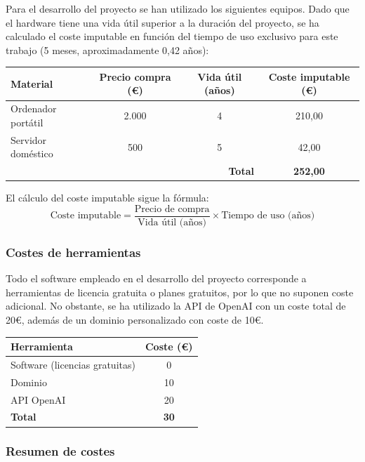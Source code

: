 Para el desarrollo del proyecto se han utilizado los siguientes equipos. Dado que el hardware tiene una vida útil superior a la duración del proyecto, se ha calculado el coste imputable en función del tiempo de uso exclusivo para este trabajo (5 meses, aproximadamente 0,42 años):

\begin{center}
\begin{tabular}{|l|c|c|c|}
\hline
\textbf{Material} & \textbf{Precio compra (€)} & \textbf{Vida útil (años)} & \textbf{Coste imputable (€)} \\
\hline
Ordenador portátil & 2.000 & 4 & 210,00 \\
Servidor doméstico & 500 & 5 & 42,00 \\
\hline
\multicolumn{3}{|r|}{\textbf{Total}} & \textbf{252,00} \\
\hline
\end{tabular}
\end{center}

\noindent El cálculo del coste imputable sigue la fórmula:
\begin{equation*}
\text{Coste imputable} = \frac{\text{Precio de compra}}{\text{Vida útil (años)}} \times \text{Tiempo de uso (años)}
\end{equation*}

\subsubsection{Costes de herramientas}

Todo el software empleado en el desarrollo del proyecto corresponde a herramientas de licencia gratuita o planes gratuitos, por lo que no suponen coste adicional. No obstante, se ha utilizado la API de OpenAI con un coste total de 20€, además de un dominio personalizado con coste de 10€.

\begin{center}
\begin{tabular}{|l|c|}
\hline
\textbf{Herramienta} & \textbf{Coste (€)} \\
\hline
Software (licencias gratuitas) & 0 \\
Dominio & 10 \\
API OpenAI & 20 \\
\hline
\textbf{Total} & \textbf{30} \\
\hline
\end{tabular}
\end{center}

\subsubsection{Resumen de costes}

